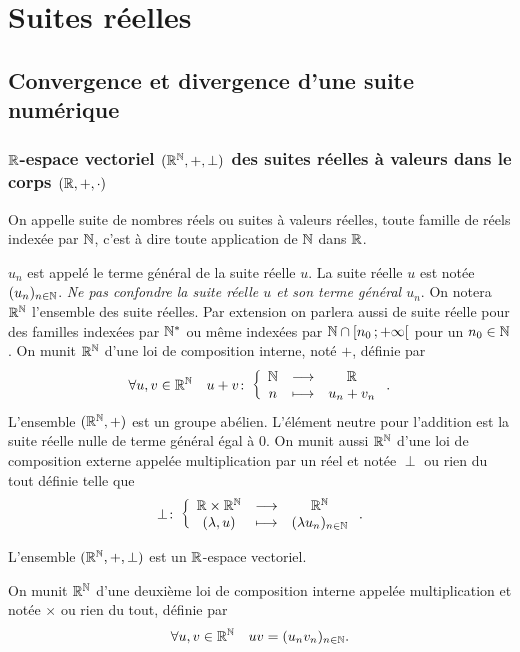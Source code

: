 \chapter{Suites  réelles}
\label{chap:suites}
\minitoc
\minilof
\minilot
\section{Convergence et divergence d'une suite numérique}

\subsection{$\mathbb{R}$-espace vectoriel $(\mathbb{R}^{\mathbb{N}},+,\perp)$ des suites réelles à valeurs dans le corps $(\mathbb{R},+,\cdot)$}

\begin{defdef}
  On appelle suite de nombres réels ou suites à valeurs réelles, toute famille de réels indexée par $\mathbb{N}$, c'est à dire toute application de $\mathbb{N}$ dans $\mathbb{R}$.
\end{defdef}
$u_n$ est appelé le terme général de la suite réelle $u$. La suite réelle $u$ est notée $(u_n)_{n\in\mathbb{N}}$. \emph{Ne pas confondre la suite réelle $u$ et son terme général $u_n$}. On notera $\mathbb{R}^{\mathbb{N}}$ l'ensemble des suite réelles. Par extension on parlera aussi de suite réelle pour des familles indexées par $\mathbb{N}^*$ ou même indexées par $\mathbb{N} \cap \left[ n_0 \, ;  +\infty \right[$ pour un $n_0 \in \mathbb{N}$. On munit $\mathbb{R}^{\mathbb{N}}$ d'une loi de composition interne, noté $+$, définie par
\begin{equation}
  \forall u,v \in \mathbb{R}^{\mathbb{N}} \quad u+v\colon \left\{\begin{array}{ccc} \mathbb{N} & \longrightarrow &\mathbb{R}\\ n & \longmapsto & u_n+v_n \end{array} \right..
\end{equation}
L'ensemble $(\mathbb{R}^{\mathbb{N}},+)$ est un groupe abélien. L'élément neutre pour l'addition est la suite réelle nulle de terme général égal à $0$. On munit aussi $\mathbb{R}^{\mathbb{N}}$ d'une loi de composition externe appelée multiplication par un réel et notée $\perp$ ou rien du tout définie telle que
\begin{equation}
  \perp\colon \left\{\begin{array}{ccc} \mathbb{R}\times\mathbb{R}^{\mathbb{N}} & \longrightarrow &\mathbb{R}^{\mathbb{N}}\\ (\lambda,u) & \longmapsto & (\lambda u_n)_{n\in\mathbb{N}} \end{array} \right..
\end{equation}
\begin{prop}
  L'ensemble $(\mathbb{R}^{\mathbb{N}},+,\perp)$ est un $\mathbb{R}$-espace vectoriel.
\end{prop}
On munit $\mathbb{R}^{\mathbb{N}}$ d'une deuxième loi de composition interne appelée multiplication et notée $\times$ ou rien du tout, définie par
\begin{equation}
  \forall u,v \in \mathbb{R}^{\mathbb{N}} \quad uv=(u_nv_n)_{n\in \mathbb{N}}.
\end{equation}
